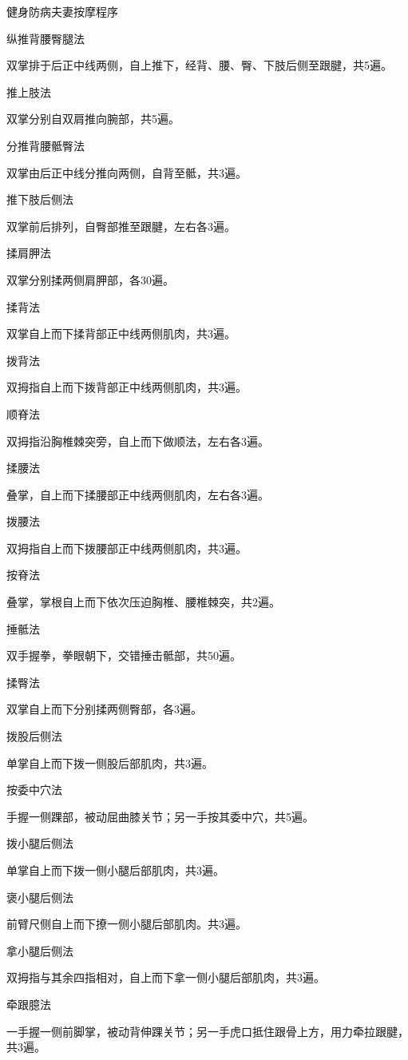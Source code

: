 \documentclass[12pt,UTF8]{ctexbook}
\begin{document}
健身防病夫妻按摩程序


纵推背腰臀腿法

双掌排于后正中线两侧，自上推下，经背、腰、臀、下肢后侧至跟腱，共5遍。

推上肢法

双掌分别自双肩推向腕部，共5遍。

分推背腰骶臀法

双掌由后正中线分推向两侧，自背至骶，共3遍。

推下肢后侧法

双掌前后排列，自臀部推至跟腱，左右各3遍。

揉肩胛法

双掌分别揉两侧肩胛部，各30遍。

揉背法

双掌自上而下揉背部正中线两侧肌肉，共3遍。

拨背法

双拇指自上而下拨背部正中线两侧肌肉，共3遍。

顺脊法

双拇指沿胸椎棘突旁，自上而下做顺法，左右各3遍。

揉腰法

叠掌，自上而下揉腰部正中线两侧肌肉，左右各3遍。

拨腰法

双拇指自上而下拨腰部正中线两侧肌肉，共3遍。

按脊法

叠掌，掌根自上而下依次压迫胸椎、腰椎棘突，共2遍。

捶骶法

双手握拳，拳眼朝下，交错捶击骶部，共50遍。

揉臀法

双掌自上而下分别揉两侧臀部，各3遍。

拨股后侧法

单掌自上而下拨一侧股后部肌肉，共3遍。

按委中穴法

手握一侧踝部，被动屈曲膝关节；另一手按其委中穴，共5遍。

拨小腿后侧法

单掌自上而下拨一侧小腿后部肌肉，共3遍。

褒小腿后侧法

前臂尺侧自上而下撩一侧小腿后部肌肉。共3遍。

拿小腿后侧法

双拇指与其余四指相对，自上而下拿一侧小腿后部肌肉，共3遍。

牵跟臆法

一手握一侧前脚掌，被动背伸踝关节；另一手虎口抵住跟骨上方，用力牵拉跟腱，共3遍。
\end{document}
